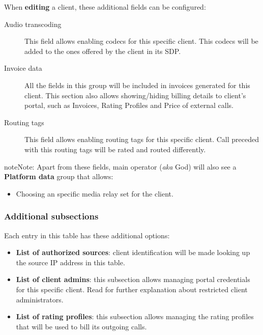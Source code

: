 \documentclass[letterpaper,10pt,english]{sphinxmanual}
\begin{document}
When \textbf{editing} a client, these additional fields can be configured:
\begin{description}
\item[{Audio transcoding}] \leavevmode{}\label{administration_portal/brand/clients/wholesale:term-audio-transcoding}
This field allows enabling codecs for this specific client. This codecs will be added to
the ones offered by the client in its SDP.

\item[{Invoice data}] \leavevmode{}\label{administration_portal/brand/clients/wholesale:term-invoice-data}
All the fields in this group will be included in invoices generated for this client. This section also allows
showing/hiding billing details to client's portal, such as Invoices, Rating Profiles and Price of external calls.

\item[{Routing tags}] \leavevmode{}\label{administration_portal/brand/clients/wholesale:term-routing-tags}
This field allows enabling routing tags for this specific client. Call preceded with this
routing tags will be rated and routed differently.

\end{description}

\begin{notice}{note}{Note:}
Apart from these fields, main operator (\emph{aka} God) will also see a \textbf{Platform data} group that allows:
\begin{itemize}
\item {} 
Choosing an specific media relay set for the client.

\end{itemize}
\end{notice}


\subsubsection{Additional subsections}
\label{administration_portal/brand/clients/wholesale:additional-subsections}
Each entry in this table has these additional options:
\begin{itemize}
\item {} 
\textbf{List of authorized sources}: client identification will be made looking up the source IP address in this table.

\item {} 
\textbf{List of client admins}: this subsection allows managing portal credentials for this specific client. Read {\hyperref[api_rest/acls:acls]{}}
for further explanation about restricted client administrators.

\item {} 
\textbf{List of rating profiles}: this subsection allows managing the rating profiles that will be used to bill its outgoing calls.

\end{itemize}
\end{document}
